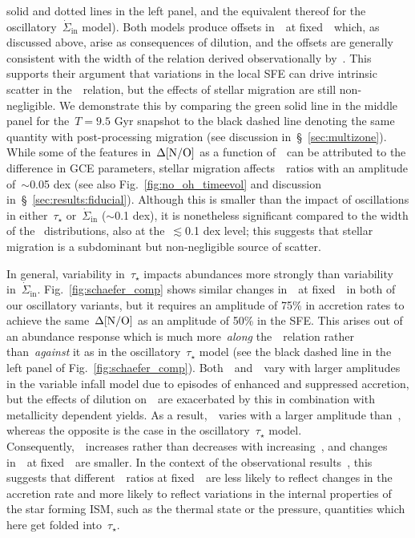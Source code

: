 \documentclass[ms.tex]{subfiles}
\begin{document}
solid and dotted lines in the left panel, and the equivalent thereof for the
oscillatory~$\dot{\Sigma}_\text{in}$ model).
Both models produce offsets in~\no~at fixed~\oh~which, as discussed above,
arise as consequences of dilution, and the offsets are generally consistent
with the width of the relation derived observationally by~\citet{Schaefer2020}.
This supports their argument that variations in the local SFE can drive
intrinsic scatter in the~\ohno~relation, but the effects of stellar migration
are still non-negligible.
We demonstrate this by comparing the green solid line in the middle panel for
the~$T = 9.5$ Gyr snapshot to the black dashed line denoting the same quantity
with post-processing migration (see discussion in~\S~\ref{sec:multizone}).
While some of the features in~$\Delta\text{[N/O]}$ as a function of~\oh~can be
attributed to the difference in GCE parameters, stellar migration
affects~\no~ratios with an amplitude of~$\sim$0.05 dex (see also
Fig.~\ref{fig:no_oh_timeevol} and discussion in~\S~\ref{sec:results:fiducial}).
Although this is smaller than the impact of oscillations in either~$\tau_\star$
or~$\dot{\Sigma}_\text{in}$ ($\sim$0.1 dex), it is nonetheless significant
compared to the width of the~\citet{Schaefer2020} distributions, also at
the~$\lesssim$0.1 dex level; this suggests that stellar migration is a
subdominant but non-negligible source of scatter.
\par
In general, variability in~$\tau_\star$ impacts abundances more strongly than
variability in~$\dot{\Sigma}_\text{in}$.
Fig.~\ref{fig:schaefer_comp} shows similar changes in~\no~at fixed~\oh~in both
of our oscillatory variants, but it requires an amplitude of 75\% in accretion
rates to achieve the same~$\Delta\text{[N/O]}$ as an amplitude of 50\% in the SFE.
This arises out of an abundance response which is much more~\textit{along}
the~\ohno~relation rather than~\textit{against} it as in the
oscillatory~$\tau_\star$ model (see the black dashed line in the left panel of
Fig.~\ref{fig:schaefer_comp}).
Both~\oh~and~\nh~vary with larger amplitudes in the variable infall model due to
episodes of enhanced and suppressed accretion, but the effects of dilution
on~\nh~are exacerbated by this in combination with metallicity dependent yields.
As a result,~\nh~varies with a larger amplitude than~\oh, whereas the opposite
is the case in the oscillatory~$\tau_\star$ model.
Consequently,~\no~increases rather than decreases with increasing~\oh, and
changes in~\no~at fixed~\oh~are smaller.
In the context of the observational results~\citep{Schaefer2020}, this suggests
that different~\no~ratios at fixed~\oh~are less likely to reflect changes in
the accretion rate and more likely to reflect variations in the internal
properties of the star forming ISM, such as the thermal state or the pressure,
quantities which here get folded into~$\tau_\star$.
\end{document}
